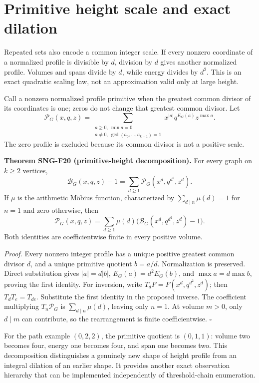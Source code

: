 \documentclass[
  11pt,
  a4paper,
]{report}
\begin{document}
\hypertarget{primitive-height-scale-and-exact-dilation}{%
\section{Primitive height scale and exact
dilation}\label{primitive-height-scale-and-exact-dilation}}

Repeated sets also encode a common integer scale. If every nonzero
coordinate of a normalized profile is divisible by \(d\), division by
\(d\) gives another normalized profile. Volumes and spans divide by
\(d\), while energy divides by \(d^2\). This is an exact quadratic
scaling law, not an approximation valid only at large height.

Call a nonzero normalized profile primitive when the greatest common
divisor of its coordinates is one; zeros do not change that greatest
common divisor. Let \[
\mathcal P_G(x,q,z)
=\sum_{\substack{a\ge0,\ \min a=0\\a\ne0,\ \gcd(a_0,\ldots,a_{k-1})=1}}
x^{|a|}q^{E_G(a)}z^{\max a}.
\] The zero profile is excluded because its common divisor is not a
positive scale.

\textbf{Theorem SNG-F20 (primitive-height decomposition).} For every
graph on \(k\ge2\) vertices, \[
\mathcal B_G(x,q,z)-1
=\sum_{d\ge1}\mathcal P_G(x^d,q^{d^2},z^d).
\] If \(\mu\) is the arithmetic Möbius function, characterized by
\(\sum_{d\mid n}\mu(d)=1\) for \(n=1\) and zero otherwise, then \[
\mathcal P_G(x,q,z)
=\sum_{d\ge1}\mu(d)
\bigl(\mathcal B_G(x^d,q^{d^2},z^d)-1\bigr).
\] Both identities are coefficientwise finite in every positive volume.

\emph{Proof.} Every nonzero integer profile has a unique positive
greatest common divisor \(d\), and a unique primitive quotient
\(b=a/d\). Normalization is preserved. Direct substitution gives
\(|a|=d|b|\), \(E_G(a)=d^2E_G(b)\), and \(\max a=d\max b\), proving the
first identity. For inversion, write \(T_dF=F(x^d,q^{d^2},z^d)\); then
\(T_dT_e=T_{de}\). Substitute the first identity in the proposed
inverse. The coefficient multiplying \(T_n\mathcal P_G\) is
\(\sum_{d\mid n}\mu(d)\), leaving only \(n=1\). At volume \(m>0\), only
\(d\mid m\) can contribute, so the rearrangement is finite
coefficientwise. \(\square\)

For the path example \((0,2,2)\), the primitive quotient is \((0,1,1)\):
volume two becomes four, energy one becomes four, and span one becomes
two. This decomposition distinguishes a genuinely new shape of height
profile from an integral dilation of an earlier shape. It provides
another exact observation hierarchy that can be implemented
independently of threshold-chain enumeration.
\end{document}

